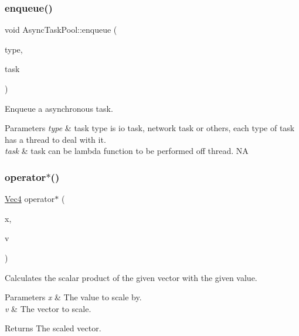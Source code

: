 \subsubsection{\texorpdfstring{enqueue()}{enqueue()}\hspace{0.1cm}{\footnotesize\ttfamily [3/3]}}
{\footnotesize\ttfamily void Async\+Task\+Pool\+::enqueue (\begin{DoxyParamCaption}\item[{Async\+Task\+Pool\+::\+Task\+Type}]{type,  }\item[{std\+::function$<$ void()$>$}]{task }\end{DoxyParamCaption})\hspace{0.3cm}{\ttfamily [inline]}}

Enqueue a asynchronous task.


\begin{DoxyParams}{Parameters}
{\em type} & task type is io task, network task or others, each type of task has a thread to deal with it. \\
\hline
{\em task} & task can be lambda function to be performed off thread.  NA \\
\hline
\end{DoxyParams}
\mbox{\label{group__base_gac25c78734b1bfed5aa6640a99d959521}} 
\subsubsection{\texorpdfstring{operator$\ast$()}{operator*()}\hspace{0.1cm}{\footnotesize\ttfamily [1/5]}}
{\footnotesize\ttfamily \hyperlink{classVec4}{Vec4} operator$\ast$ (\begin{DoxyParamCaption}\item[{float}]{x,  }\item[{const \hyperlink{classVec4}{Vec4} \&}]{v }\end{DoxyParamCaption})\hspace{0.3cm}{\ttfamily [inline]}}

Calculates the scalar product of the given vector with the given value.


\begin{DoxyParams}{Parameters}
{\em x} & The value to scale by. \\
\hline
{\em v} & The vector to scale. \\
\hline
\end{DoxyParams}
\begin{DoxyReturn}{Returns}
The scaled vector. 
\end{DoxyReturn}
\mbox{\label{group__base_gabe35c8607e1e848d7f3f5b10103bd5e1}} 
